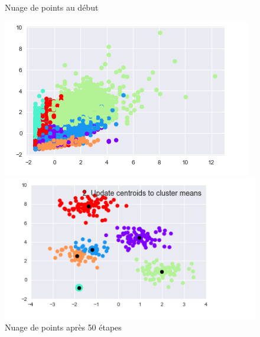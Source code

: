 \documentclass[11pt]{article}
\begin{document}
\begin{figure}[!htb]
  \centering
    \caption{Nuage de points au début}
    \includegraphics[width=\textwidth]{kmeansdeb.png}


  \centering
    \caption{Nuage de points après 50 étapes}
    \includegraphics[width=\textwidth]{kmeansfin.png}


\end{figure}

\clearpage
\end{document}
